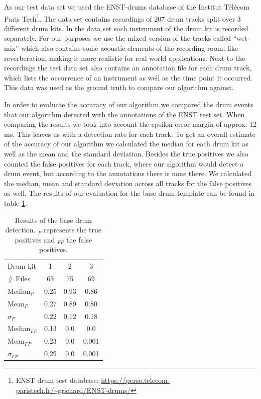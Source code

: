 \documentclass{article}
\begin{document}
As our test data set we used the ENST-drums database of the Institut Télécom Paris Tech\footnote{ENST drum test database: \url{https://perso.telecom-paristech.fr/~grichard/ENST-drums/}}.
The data set contains recordings of 207 drum tracks split over 3 different drum kits.
In the data set each instrument of the drum kit is recorded separately.
For our purposes we use the mixed version of the tracks called ``wet-mix'' which also contains some acoustic elements of the recording room, like reverberation, making it more realistic for real world applications.
Next to the recordings the test data set also contains an annotation file for each drum track, which lists the occurrence of an instrument as well as the time point it occurred.
This data was used as the ground truth to compare our algorithm against.

In order to evaluate the accuracy of our algorithm we compared the drum events that our algorithm detected with the annotations of the ENST test set.
When comparing the results we took into account the epsilon error margin of approx. 12 ms.
This leaves us with a detection rate for each track.
To get an overall estimate of the accuracy of our algorithm we calculated the median for each drum kit as well as the mean and the standard deviation.
Besides the true positives we also counted the false positives for each track, where our algorithm would detect a drum event, but according to the annotations there is none there.
We calculated the median, mean and standard deviation across all tracks for the false positives as well.
The results of our evaluation for the base drum template can be found in table \ref{tab:results}.


\begin{table}[h]
  \centering
  \begin{tabular}{l | c c c}
      Drum kit  &  1 & 2 & 3 \\
      \# Files &   63 &   75 & 69 \\
      \hline
      Median$_{P}$   & 0.25 & 0.93 & 0.86 \\
      Mean$_{P}$     & 0.27 & 0.89 & 0.80 \\
      $\sigma_P$     & 0.22 & 0.12 & 0.18 \\
      \hline
      Median$_{FP}$   & 0.13 & 0.0 & 0.0 \\
      Mean$_{FP}$     & 0.23 & 0.0 & 0.001 \\
      $\sigma_{FP}$   & 0.29 & 0.0 & 0.001 \\
  \end{tabular}
  \caption{Results of the base drum detection. $_P$ represents the true positives and $_{FP}$ the false positives.}
  \label{tab:results}
\end{table}
\end{document}
